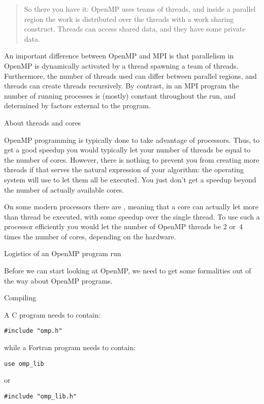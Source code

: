 \begin{quote}
  So there you have it: OpenMP uses teams of threads, and inside
  a parallel region the work is distributed over the threads with a work sharing construct.
  Threads can access shared data, and they have some private data.
\end{quote}

An important difference between OpenMP and MPI is that parallelism in
OpenMP is dynamically activated by a thread spawning a team of
threads. Furthermore,
the number of threads used can differ between parallel regions, and
threads can create threads recursively. 
By contrast, in an MPI program the number
of running processes is (mostly) constant throughout the run, and
determined by factors external to the program.

 {About threads and cores}

OpenMP programming is typically done to take advantage of
 processors. Thus, to get a good speedup you
would typically let your number of threads be equal to the number of
cores. However, there is nothing to prevent you from creating more
threads if that serves the natural expression of your algorithm:
the operating system will use  to let
them all be executed. You just don't get a speedup beyond the number
of actually available cores.

On some modern processors there are ,
meaning that a core can actually let more than thread be executed,
with some speedup over the single thread. To use such a processor
efficiently you would let the number of OpenMP threads be
2 or~4 times the number of cores, depending on the hardware.

 {Logistics of an OpenMP program run}

Before we can start looking at OpenMP,
we need to get some formalities out of the way
about OpenMP programs.

 {Compiling}

A C program needs to contain:
\begin{lstlisting}
#include "omp.h"
\end{lstlisting}
while a Fortran program needs to contain:
\begin{lstlisting}
use omp_lib
\end{lstlisting}
or
\begin{lstlisting}
#include "omp_lib.h"
\end{lstlisting}

